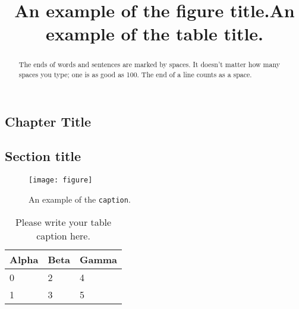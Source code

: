 \begin{frontmatter}

\chapter{Chapter Title}\label{chap1}


\begin{abstract}
 The ends of words and sentences are marked by spaces. It doesn't
 matter how many spaces you type; one is as good as 100.  The end of
 a line counts as a space.
\end{abstract}

\begin{keywords}
\end{keywords}

\end{frontmatter}


\section{Section title}\label{sec1}

\begin{figure}[htbp]
  \title{An example of the figure title.} %
  \texttt{[image: figure]}
  \caption{An example of the \texttt{caption}.} %
  \label{fig:1} %
\end{figure}

\begin{table}[htbp]
  \title{An example of the table title.} %
  \label{tab:1} %
  \begin{tabularx}{\textwidth}{| X | X | X |}
    \hline
    Alpha     & Beta     & Gamma     \\ \hline
    0         & 2        & 4         \\ \hline
    1         & 3        & 5         \\ \hline
  \end{tabularx}
  \caption{Please write your table caption here.} %
\end{table}


